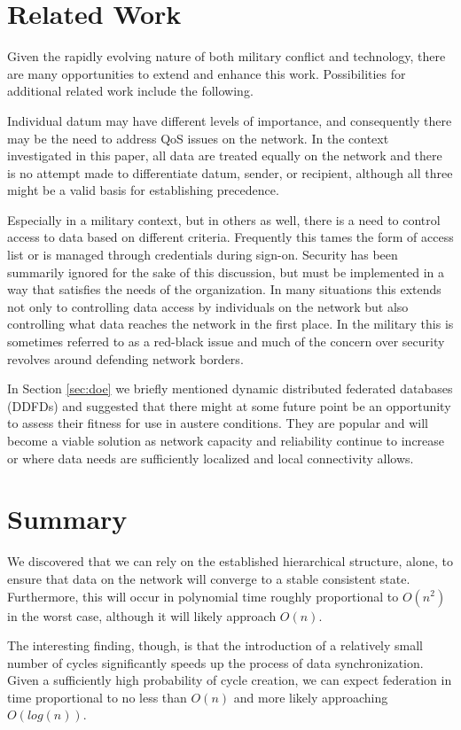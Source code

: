 \documentclass[10pt]{./IEEEtran}
\begin{document}
\section{Related Work}
\label{sec:related}
Given the rapidly evolving nature of both military conflict and technology, there are many opportunities to extend and enhance this work.  Possibilities for additional related work include the following.

Individual datum may have different levels of importance, and consequently there may be the need to address QoS issues on the network.  In the context investigated in this paper, all data are treated equally on the network and there is no attempt made to differentiate datum, sender, or recipient, although all three might be a valid basis for establishing precedence.

Especially in a military context, but in others as well, there is a need to control access to data based on different criteria.  Frequently this tames the form of access list or is managed through credentials during sign-on.  Security has been summarily ignored for the sake of this discussion, but must be implemented in a way that satisfies the needs of the organization.  In many situations this extends not only to controlling data access by individuals on the network but also controlling what data reaches the network in the first place.  In the military this is sometimes referred to as a red-black issue and much of the concern over security revolves around defending network borders.
	
In Section \ref{sec:doe} we briefly mentioned dynamic distributed federated databases (DDFDs) and suggested that there might at some future point be an opportunity to assess their fitness for use in austere conditions.  They are popular and will become a viable solution as network capacity and reliability continue to increase or where data needs are sufficiently localized and local connectivity allows.


\section{Summary}
\label{sec:conclusion}
We discovered that we can rely on the established hierarchical structure, alone, to ensure that data on the network will converge to a stable consistent state.  Furthermore, this will occur in polynomial time roughly proportional to $O(n^{2})$ in the worst case, although it will likely approach $O(n)$.  

The interesting finding, though, is that the introduction of a relatively small number of cycles significantly speeds up the process of data synchronization\cite{Watts:1998}.  Given a sufficiently high probability of cycle creation, we can expect federation in time proportional to no less than $O(n)$ and more likely approaching $O(log(n))$.
\end{document}
